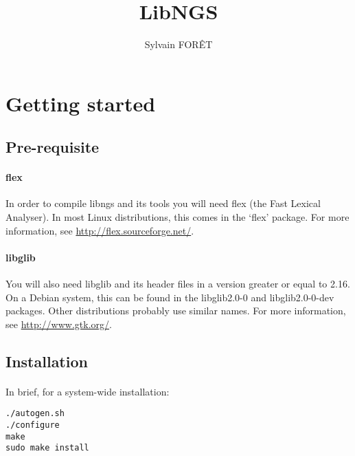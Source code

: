 \documentclass[a4paper,12pt]{article}
\title{LibNGS}
\author{Sylvain FOR\^ET}
\begin{document}
\maketitle

\newpage

\tableofcontents

\newpage


\section{Getting started}

\subsection{Pre-requisite}

\paragraph{flex} In order to compile libngs and its tools you will need flex
(the Fast Lexical Analyser).  In most Linux distributions, this comes in the
`flex' package.  For more information, see \url{http://flex.sourceforge.net/}.

\paragraph{libglib} You will also need libglib and its header files in a
version greater or equal to 2.16.  On a Debian system, this can be found in the
libglib2.0-0 and libglib2.0-0-dev packages.  Other distributions probably use
similar names.  For more information, see \url{http://www.gtk.org/}.

\subsection{Installation}

\paragraph{}
In brief, for a system-wide installation:

\begin{verbatim}
./autogen.sh
./configure
make
sudo make install
\end{verbatim}
\end{document}
